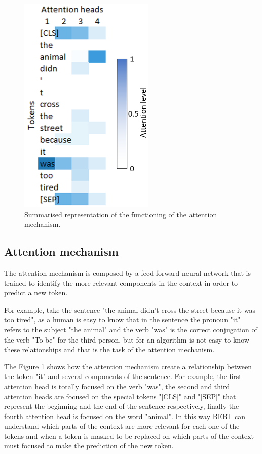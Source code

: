 \documentclass[10pt,twocolumn,letterpaper]{article}
\begin{document}
\begin{figure}[b]
   \centering
   \includegraphics[scale=0.8]{attentionPlot.PNG}
   \caption{Summarised representation of the functioning of the attention mechanism.}
   \label{fig:AttentFig}
\end{figure}

\subsection{Attention mechanism}
The attention mechanism is composed by a feed forward neural network that is trained to
identify the more relevant components in the context in order to predict a new token.

For example, take the sentence "the animal didn't cross the street because it was too tired",
as a human is easy to know that in the sentence the pronoun "it" refers to the subject "the animal"
and the verb "was" is the correct conjugation of the verb "To be" for the third person, but for an
algorithm is not easy to know these relationships and that is the task of the attention mechanism.

The Figure \ref{fig:AttentFig}  shows how the attention mechanism create a relationship between the token "it" and several components
of the sentence.
For example, the first attention head is totally focused on the verb "was", the second and third
attention heads are focused on the special tokens "[CLS]" and "[SEP]" that represent the beginning and the end of
the sentence respectively, finally the fourth attention head is focused on the word "animal".
In this way BERT can understand which parts of the context are more relevant for each one of the tokens and when a token
is masked to be replaced on which parts of the context must focused to make the prediction of the new token.
\end{document}

